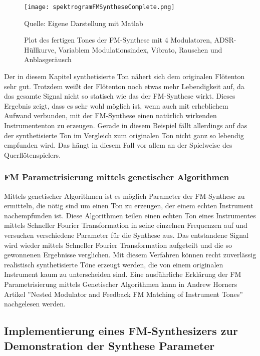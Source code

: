\begin{figure} [h!t!b!]
\centering
  \texttt{[image: spektrogramFMSyntheseComplete.png]}
\caption{Plot des fertigen Tones der FM-Synthese mit 4 Modulatoren, ADSR-Hüllkurve, Variablem Modulationsindex, Vibrato, Rauschen und Anblasgeräusch}
\label{fig:spektrogramFMSyntheseComplete}
Quelle: Eigene Darstellung mit Matlab
\end{figure}

Der in diesem Kapitel synthetisierte Ton nähert sich dem originalen Flötenton sehr gut. Trotzdem weißt der Flötenton noch etwas mehr Lebendigkeit auf, da das gesamte Signal nicht so statisch wie das der FM-Synthese wirkt. Dieses Ergebnis zeigt, dass es sehr wohl möglich ist, wenn auch mit erheblichem Aufwand verbunden, mit der FM-Synthese einen natürlich wirkenden Instrumententon zu erzeugen. Gerade in diesem Beispiel fällt allerdings auf das der synthetisierte Ton im Vergleich zum originalen Ton nicht ganz so lebendig empfunden wird. Das hängt in diesem Fall vor allem an der Spielweise des Querflötenspielers.


\FloatBarrier
\subsubsection{FM Parametrisierung mittels genetischer Algorithmen}

Mittels genetischer Algorithmen ist es möglich Parameter der FM-Synthese zu ermitteln, die nötig sind um einen Ton zu erzeugen, der einem echten Instrument nachempfunden ist. Diese Algorithmen teilen einen echten Ton eines Instrumentes mittels Schneller Fourier Transformation in seine einzelnen Frequenzen auf und versuchen verschiedene Parameter für die Synthese aus. Das entstandene Signal wird wieder mittels Schneller Fourier Transformation aufgeteilt und die so gewonnenen Ergebnisse verglichen. Mit diesem Verfahren können recht zuverlässig realistisch synthetisierte Töne erzeugt werden, die von einem originalen Instrument kaum zu unterscheiden sind. Eine ausführliche Erklärung der FM Parametrisierung mittels Genetischer Algorithmen kann in Andrew Horners Artikel ''Nested Modulator and Feedback FM Matching of Instrument Tones'' nachgelesen werden.

\FloatBarrier
\subsection{Implementierung eines FM-Synthesizers zur Demonstration der Synthese Parameter}

